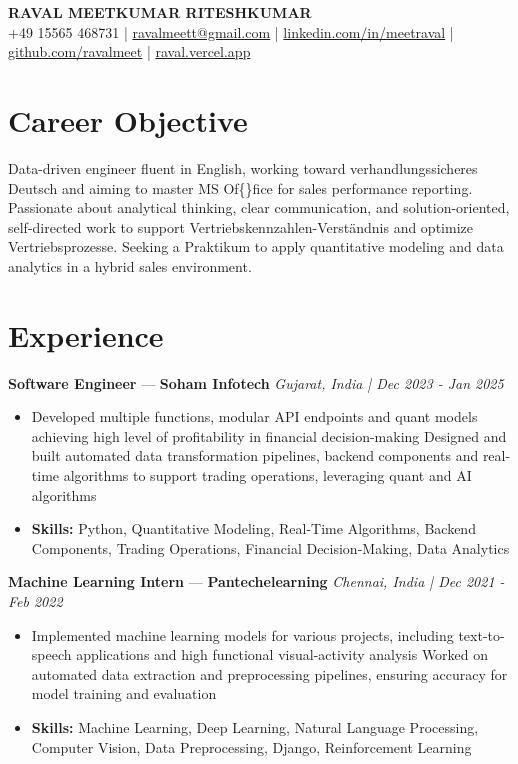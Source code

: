 \documentclass[a4paper,10pt]{article}
\begin{document}
\begin{center}
  {\Large\bfseries RAVAL MEETKUMAR RITESHKUMAR}\\[2pt]
  {\small +49 15565 468731 \;|\; \href{mailto:ravalmeett@gmail.com}{ravalmeett@gmail.com} \;|\; \href{https://www.linkedin.com/in/meetraval/}{linkedin.com/in/meetraval} \;|\; \href{https://github.com/ravalmeet}{github.com/ravalmeet} \;|\; \href{https://raval.vercel.app/}{raval.vercel.app}}
\end{center}
\vspace{-3pt}

\section*{Career Objective}
Data-driven engineer fluent in English, working toward verhandlungssicheres Deutsch and aiming to master MS Of\{\}fice for sales performance reporting. Passionate about analytical thinking, clear communication, and solution-oriented, self-directed work to support Vertriebskennzahlen-Verständnis and optimize Vertriebsprozesse. Seeking a Praktikum to apply quantitative modeling and data analytics in a hybrid sales environment.\par

\section*{Experience}
\textbf{Software Engineer} — \textbf{Soham Infotech} \hfill \textit{Gujarat, India \;|\; Dec 2023 - Jan 2025}\par
\vspace{1pt}
\begin{itemize}
  \item Developed multiple functions, modular API endpoints and quant models achieving high level of profitability in financial decision-making Designed and built automated data transformation pipelines, backend components and real-time algorithms to support trading operations, leveraging quant and AI algorithms
  \item \textbf{Skills:} Python, Quantitative Modeling, Real-Time Algorithms, Backend Components, Trading Operations, Financial Decision-Making, Data Analytics
\end{itemize}
\vspace{3pt}
\textbf{Machine Learning Intern} — \textbf{Pantechelearning} \hfill \textit{Chennai, India \;|\; Dec 2021 - Feb 2022}\par
\vspace{1pt}
\begin{itemize}
  \item Implemented machine learning models for various projects, including text-to-speech applications and high functional visual-activity analysis Worked on automated data extraction and preprocessing pipelines, ensuring accuracy for model training and evaluation
  \item \textbf{Skills:} Machine Learning, Deep Learning, Natural Language Processing, Computer Vision, Data Preprocessing, Django, Reinforcement Learning
\end{itemize}
\end{document}
